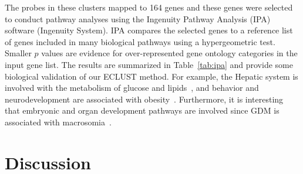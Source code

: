 
The probes in these clusters mapped to 164 genes and these genes were selected to conduct pathway analyses using the Ingenuity Pathway Analysis (IPA) software (Ingenuity System). IPA compares the selected genes to a reference list of genes included in many biological pathways using a hypergeometric test. Smaller $p$ values are evidence for over-represented gene ontology categories in the input gene list. The results are summarized in Table~\ref{tab:ipa} and provide some biological validation of our ECLUST method. For example, the Hepatic system is involved with the metabolism of glucose and lipids~\citep{saltiel2001insulin}, and behavior and neurodevelopment are associated with obesity~\citep{epstein2004effect}. Furthermore, it is interesting that embryonic and organ development pathways are involved since GDM is associated with macrosomia~\citep{ehrenberg2004influence}. 



\section{Discussion}

